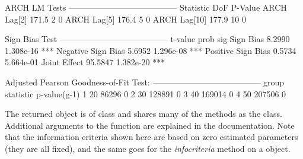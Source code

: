 \begin{Schunk}
\begin{Soutput}
ARCH LM Tests
---------------------------------------
             Statistic DoF P-Value
ARCH Lag[2]      171.5   2       0
ARCH Lag[5]      176.4   5       0
ARCH Lag[10]     177.9  10       0


Sign Bias Test
---------------------------------------
                   t-value      prob sig
Sign Bias           8.2990 1.308e-16 ***
Negative Sign Bias  5.6952 1.296e-08 ***
Positive Sign Bias  0.5734 5.664e-01
Joint Effect       95.5847 1.382e-20 ***


Adjusted Pearson Goodness-of-Fit Test:
---------------------------------------
  group statistic p-value(g-1)
1    20     86296            0
2    30    128891            0
3    40    169014            0
4    50    207506            0
\end{Soutput}
\end{Schunk}
The returned object is of class \verb@uGARCHfilter@ and shares many of the methods
as the \verb@uGARCHfit@ class. Additional arguments to the function are explained
in the documentation. Note that the information criteria shown here are based on
zero estimated parameters (they are all fixed), and the same goes for the
\emph{infocriteria} method on a \verb@uGARCHfilter@ object.

